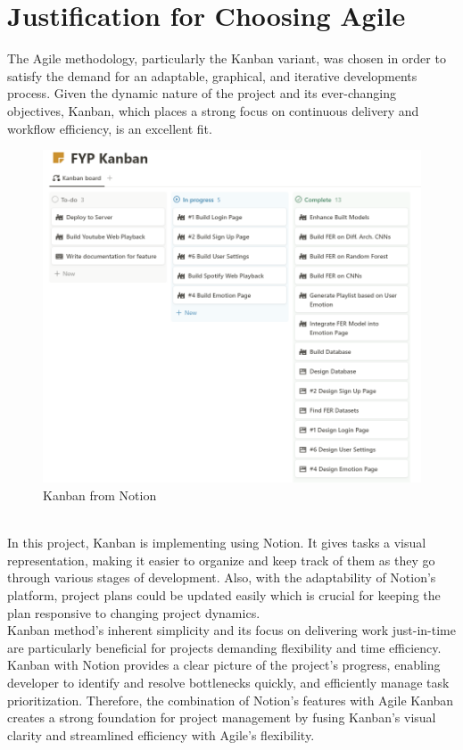 \section{Justification for Choosing Agile}
The Agile methodology, particularly the Kanban variant, was chosen in order to satisfy the demand for an adaptable, graphical, and iterative developments process.
Given the dynamic nature of the project and its ever-changing objectives, Kanban, which places a strong focus on continuous delivery and workflow efficiency, is an excellent fit.
\\
\begin{figure}[!ht]
    \centering
    \includegraphics[width=12cm]{Images/kanban.png}
    \caption{Kanban from Notion}
    \label{fig:kanban}
\end{figure}
\\
\indent In this project, Kanban is implementing using Notion.
It gives tasks a visual representation, making it easier to organize and keep track of them as they go through various stages of development.
Also, with the adaptability of Notion's platform, project plans could be updated easily which is crucial for keeping the plan responsive to changing project dynamics.
\\
\indent Kanban method's inherent simplicity and its focus on delivering work just-in-time are particularly beneficial for projects demanding flexibility and time efficiency.
Kanban with Notion provides a clear picture of the project's progress, enabling developer to identify and resolve bottlenecks quickly, and efficiently manage task prioritization.
Therefore, the combination of Notion's features with Agile Kanban creates a strong foundation for project management by fusing Kanban's visual clarity and streamlined efficiency with Agile's flexibility. 

